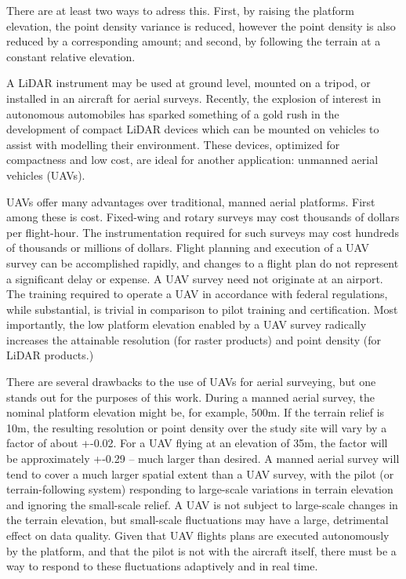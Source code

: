\documentclass[10pt,a4paper]{report}
\begin{document}
There are at least two ways to adress this. First, by raising the platform elevation, the point density variance is reduced, however the point density is also reduced by a corresponding amount; and second, by following the terrain at a constant relative elevation.

A LiDAR instrument may be used at ground level, mounted on a tripod, or installed in an aircraft for aerial surveys. Recently, the explosion of interest in autonomous automobiles has sparked something of a gold rush in the development of compact LiDAR devices which can be mounted on vehicles to assist with modelling their environment. These devices, optimized for compactness and low cost, are ideal for another application: unmanned aerial vehicles (UAVs).

UAVs offer many advantages over traditional, manned aerial platforms. First among these is cost. Fixed-wing and rotary surveys may cost thousands of dollars per flight-hour. The instrumentation required for such surveys may cost hundreds of thousands or millions  of dollars. Flight planning and execution of a UAV survey can be accomplished rapidly, and changes to a flight plan do not represent a significant delay or expense. A UAV survey need not originate at an airport. The training required to operate a UAV in accordance with federal regulations, while substantial, is trivial in comparison to pilot training and certification. Most importantly, the low platform elevation enabled by a UAV survey radically increases the attainable resolution (for raster products) and point density (for LiDAR products.)

There are several drawbacks to the use of UAVs for aerial surveying, but one stands out for the purposes of this work. During a manned aerial survey, the nominal platform elevation might be, for example, 500m. If the terrain relief is 10m, the resulting resolution or point density over the study site will vary by a factor of about +-0.02. For a UAV flying at an elevation of 35m, the factor will be approximately +-0.29 -- much larger than desired. A manned aerial survey will tend to cover a much larger spatial extent than a UAV survey, with the pilot (or terrain-following system) responding to large-scale variations in terrain elevation and ignoring the small-scale relief. A UAV is not subject to large-scale changes in the terrain elevation, but small-scale fluctuations may have a large, detrimental effect on data quality. Given that UAV flights plans are executed autonomously by the platform, and that the pilot is not with the aircraft itself, there must be a way to respond to these fluctuations adaptively and in real time.
\end{document}
